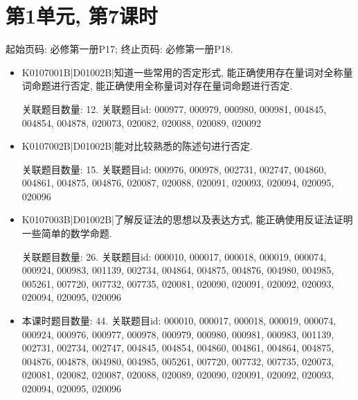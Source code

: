 \section*{第1单元, 第7课时}
起始页码: 必修第一册P17; 终止页码: 必修第一册P18.
\begin{itemize}
\item K0107001B|D01002B|知道一些常用的否定形式, 能正确使用存在量词对全称量词命题进行否定, 能正确使用全称量词对存在量词命题进行否定.

关联题目数量: 12. 关联题目id: 000977, 000979, 000980, 000981, 004845, 004854, 004878, 020073, 020082, 020088, 020089, 020092

\item K0107002B|D01002B|能对比较熟悉的陈述句进行否定.

关联题目数量: 15. 关联题目id: 000976, 000978, 002731, 002747, 004860, 004861, 004875, 004876, 020087, 020088, 020091, 020093, 020094, 020095, 020096

\item K0107003B|D01002B|了解反证法的思想以及表达方式, 能正确使用反证法证明一些简单的数学命题.

关联题目数量: 26. 关联题目id: 000010, 000017, 000018, 000019, 000074, 000924, 000983, 001139, 002734, 004864, 004875, 004876, 004980, 004985, 005261, 007720, 007732, 007735, 020081, 020090, 020091, 020092, 020093, 020094, 020095, 020096

\item 本课时题目数量: 44. 关联题目id: 000010, 000017, 000018, 000019, 000074, 000924, 000976, 000977, 000978, 000979, 000980, 000981, 000983, 001139, 002731, 002734, 002747, 004845, 004854, 004860, 004861, 004864, 004875, 004876, 004878, 004980, 004985, 005261, 007720, 007732, 007735, 020073, 020081, 020082, 020087, 020088, 020089, 020090, 020091, 020092, 020093, 020094, 020095, 020096

\end{itemize}

